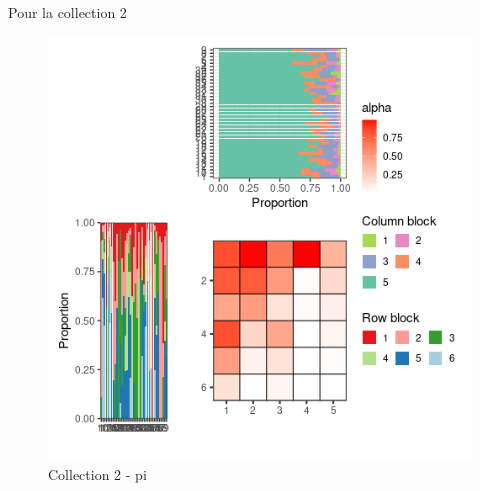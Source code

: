 Pour la collection 2

\begin{figure}
\centering
\includegraphics{figure/pi_meso_plot-2.png}
\caption{Collection 2 - pi}
\end{figure}

